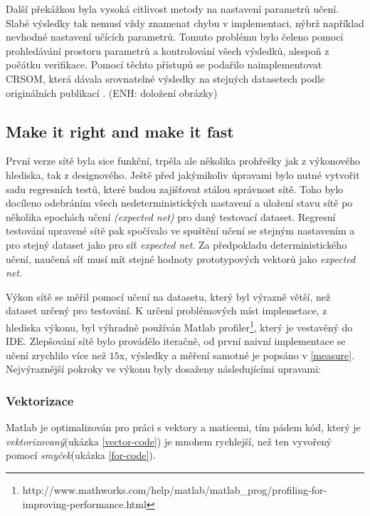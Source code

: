 \documentclass[thesis=M,czech]{FITthesis}[2012/06/26]
\begin{document}
Další překážkou byla vysoká citlivost metody na nastavení parametrů učení\cite{hartono14}. Slabé výsledky tak nemusí vždy znamenat chybu v implementaci, nýbrž například nevhodné nastavení učících parametrů. Tomuto problému bylo čeleno pomocí prohledávání prostoru parametrů a kontrolování všech výsledků, alespoň z počátku verifikace.
Pomocí těchto přístupů se podařilo naimplementovat CRSOM, která dávala srovnatelné výsledky na stejných datasetech podle originálních publikací \cite{hartono14}. (ENH: doložení obrázky)

\subsection{Make it right and make it fast}

První verze sítě byla sice funkční, trpěla ale několika prohřešky jak z výkonového hlediska, tak z designového. Ještě před jakýmikoliv úpravami bylo nutné vytvořit sadu regresních testů, které budou zajišťovat stálou správnost sítě. Toho bylo docíleno odebráním všech nedeterministických nastavení a uložení stavu sítě po několika epochách učení \textit{(expected net)} pro daný testovací dataset.  Regresní testování upravené sítě pak spočívalo ve spuštění učení se stejným nastavením a pro stejný dataset jako pro síť \textit{expected net}. Za předpokladu deterministického učení, naučená síť musí mít stejné hodnoty prototypových vektorů jako \textit{expected net}.

Výkon sítě se měřil pomocí učení na datasetu, který byl výrazně větší, než dataset určený pro testování. K určení problémových míst implemetace, z hlediska výkonu, byl výhradně používán Matlab profiler\footnote{http://www.mathworks.com/help/matlab/matlab\_prog/profiling-for-improving-performance.html}, který je vestavěný do IDE. Zlepšování sítě bylo provádělo iteračně, od první naivní implementace se učení zrychlilo více než $15$x, výsledky a měření samotné je popsáno v \ref{measure}. Nejvýraznější pokroky ve výkonu byly dosaženy následujícími upravami:





\subsubsection*{Vektorizace}
Matlab je optimalizován pro práci s vektory a maticemi, tím pádem kód, který je \textit{vektorizovaný}(ukázka \ref{vector-code}) je mnohem rychlejší\cite{vector}, než ten vyvořený pomocí \textit{smyček}(ukázka \ref{for-code}).
\end{document}
